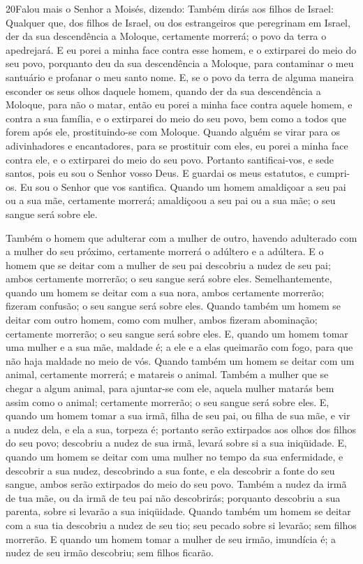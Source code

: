 \lettrine{20} Falou mais o Senhor a Moisés, dizendo:
Também dirás aos filhos de Israel: Qualquer que, dos filhos de
Israel, ou dos estrangeiros que peregrinam em Israel, der da sua
descendência a Moloque, certamente morrerá; o povo da terra o
apedrejará. E eu porei a minha face contra esse homem, e o
extirparei do meio do seu povo, porquanto deu da sua descendência a
Moloque, para contaminar o meu santuário e profanar o meu santo
nome. E, se o povo da terra de alguma maneira esconder os seus
olhos daquele homem, quando der da sua descendência a Moloque, para
não o matar, então eu porei a minha face contra aquele homem, e
contra a sua família, e o extirparei do meio do seu povo, bem como a
todos que forem após ele, prostituindo-se com Moloque. Quando
alguém se virar para os adivinhadores e encantadores, para se
prostituir com eles, eu porei a minha face contra ele, e o
extirparei do meio do seu povo. Portanto santificai-vos, e sede
santos, pois eu sou o Senhor vosso Deus. E guardai os meus
estatutos, e cumpri-os. Eu sou o Senhor que vos santifica.
Quando um homem amaldiçoar a seu pai ou a sua mãe, certamente
morrerá; amaldiçoou a seu pai ou a sua mãe; o seu sangue será sobre
ele.

Também o homem que adulterar com a mulher de outro, havendo
adulterado com a mulher do seu próximo, certamente morrerá o
adúltero e a adúltera. E o homem que se deitar com a mulher
de seu pai descobriu a nudez de seu pai; ambos certamente morrerão;
o seu sangue será sobre eles. Semelhantemente, quando um
homem se deitar com a sua nora, ambos certamente morrerão; fizeram
confusão; o seu sangue será sobre eles. Quando também um
homem se deitar com outro homem, como com mulher, ambos fizeram
abominação; certamente morrerão; o seu sangue será sobre eles.
E, quando um homem tomar uma mulher e a sua mãe, maldade é; a
ele e a elas queimarão com fogo, para que não haja maldade no meio
de vós. Quando também um homem se deitar com um animal,
certamente morrerá; e matareis o animal. Também a mulher que
se chegar a algum animal, para ajuntar-se com ele, aquela mulher
matarás bem assim como o animal; certamente morrerão; o seu sangue
será sobre eles. E, quando um homem tomar a sua irmã, filha
de seu pai, ou filha de sua mãe, e vir a nudez dela, e ela a sua,
torpeza é; portanto serão extirpados aos olhos dos filhos do seu
povo; descobriu a nudez de sua irmã, levará sobre si a sua
iniqüidade. E, quando um homem se deitar com uma mulher no
tempo da sua enfermidade, e descobrir a sua nudez, descobrindo a sua
fonte, e ela descobrir a fonte do seu sangue, ambos serão extirpados
do meio do seu povo. Também a nudez da irmã de tua mãe, ou da
irmã de teu pai não descobrirás; porquanto descobriu a sua parenta,
sobre si levarão a sua iniqüidade. Quando também um homem se
deitar com a sua tia descobriu a nudez de seu tio; seu pecado sobre
si levarão; sem filhos morrerão. E quando um homem tomar a
mulher de seu irmão, imundícia é; a nudez de seu irmão descobriu;
sem filhos ficarão.

